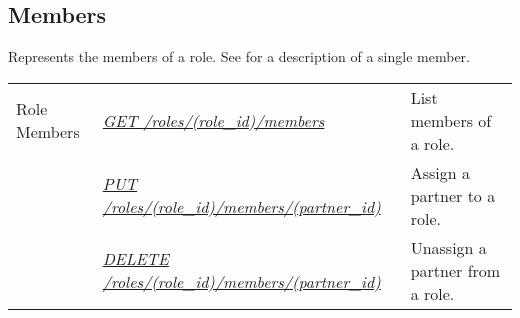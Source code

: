 \documentclass[letterpaper,10pt,english]{sphinxmanual}
\begin{document}
\subsection{Members}
\label{\detokenize{resources/role:members}}
Represents the members of a role. See {\hyperref[\detokenize{resources/partner:partner}]{}} for a description of a single member.

\noindent\begin{tabulary}{\linewidth}{|L|L|L|}
\hline
{}\relax &\relax &\relax \\
\hline
Role Members
&
{\hyperref[\detokenize{resources/role:get--roles-(role_id)-members}]{\emph{GET /roles/(role\_id)/members}}}
&
List members of a role.
\\
\hline&
{\hyperref[\detokenize{resources/role:put--roles-(role_id)-members-(partner_id)}]{\emph{PUT /roles/(role\_id)/members/(partner\_id)}}}
&
Assign a partner to a role.
\\
\hline&
{\hyperref[\detokenize{resources/role:delete--roles-(role_id)-members-(partner_id)}]{\emph{DELETE /roles/(role\_id)/members/(partner\_id)}}}
&
Unassign a partner from a role.
\\
\hline\end{tabulary}


\begin{DUlineblock}{0em}
\item[] 
\end{DUlineblock}
\end{document}
